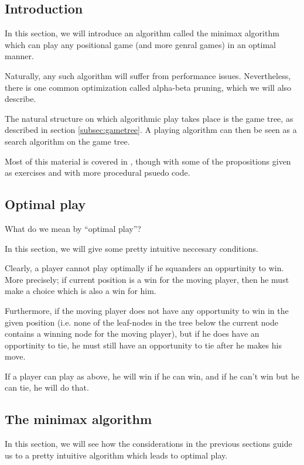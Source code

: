 \subsection{Introduction}

In this section, we will introduce an algorithm called the minimax algorithm which can play any positional game (and more genral games) in an optimal manner.

Naturally, any such algorithm will suffer from performance issues.
Nevertheless, there is one common optimization called alpha-beta pruning, which we will also describe.

The natural structure on which algorithmic play takes place is the game tree, as described in section \ref{subsec:gametree}.
A playing algorithm can then be seen as a search algorithm on the game tree.


Most of this material is covered in \citep{aimodernapproach}, though with some of the propositions given as exercises and with more procedural psuedo code.

\subsection{Optimal play}

What do we mean by ``optimal play''?

In this section, we will give some pretty intuitive neccesary conditions.

Clearly, a player cannot play optimally if he squanders an oppurtinity to win.
More precisely; if current position is a win for the moving player, then he must make a choice which is also a win for him.

Furthermore, if the moving player does not have any opportunity to win in the given position (i.e. none of the leaf-nodes in the tree below the current node contains a winning node for the moving player), but if he does have an opportinity to tie, he must still have an opportunity to tie after he makes his move.

If a player can play as above, he will win if he can win, and if he can't win but he can tie, he will do that.

\subsection{The minimax algorithm}

In this section, we will see how the considerations in the previous sections guide us to a pretty intuitive algorithm which leads to optimal play.

